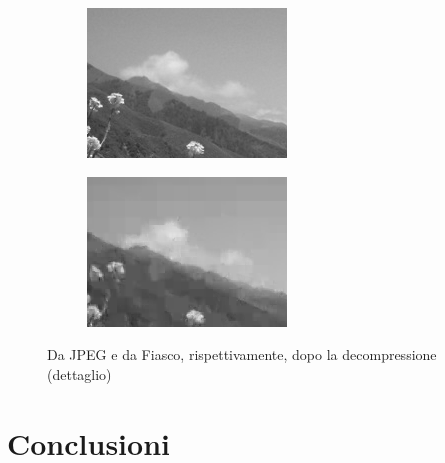 \documentclass[11pt,a4paper,appendixprefix=true,numbers=noenddot]{scrreprt}
\begin{document}
\begin{figure}[!ht]
    \begin{subfigure}[b]{0.47\textwidth}
    \includegraphics[width=\textwidth]{images/california-coast-jpeg-detail2.png}
    \end{subfigure}
    \begin{subfigure}[b]{0.47\textwidth}
        \includegraphics[width=\textwidth]{images/california-coast-fiasco-detail2.png}
    \end{subfigure}
    \caption{ Da JPEG e da Fiasco, rispettivamente, dopo la decompressione (dettaglio)}
\end{figure}

\section{Conclusioni}
\end{document}
